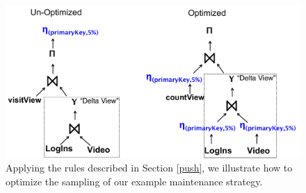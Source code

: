 \begin{figure}[t] \vspace{-2em}
\centering
 \includegraphics[scale=0.24]{figs/example_expression_tree_2.pdf} \vspace{-.5em}
 \caption{Applying the rules described in Section \ref{push}, we illustrate how to optimize the sampling of our example maintenance strategy. \label{exexpr2}}\vspace{-1.75em}
\end{figure}




